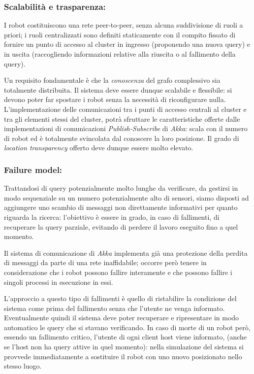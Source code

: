 \subsubsection*{Scalabilità e trasparenza:}
I robot costituiscono una rete peer-to-peer,
senza alcuna suddivisione di ruoli a priori; i ruoli centralizzati
sono definiti staticamente con il compito fissato di fornire un punto
di accesso al cluster in ingresso (proponendo una nuova query) e
in uscita (raccogliendo informazioni relative alla riuscita
o al fallimento della query).

Un requisito fondamentale è che
la \emph{conoscenza} del grafo complessivo sia totalmente distribuita.
Il sistema deve essere dunque scalabile e flessibile:
si devono poter far spostare i robot senza la necessità di
riconfigurare nulla. L'implementazione delle
comunicazioni tra i punti di accesso centrali al cluster e
tra gli elementi stessi del cluster, potrà
sfruttare le caratteristiche offerte dalle implementazioni di
comunicazioni \emph{Publish-Subscribe} di \emph{Akka}:
scala con il numero di robot ed è totalmente svincolata dal conoscere
la loro posizione.
Il grado di \emph{location transparency} offerto
deve dunque essere molto elevato.

\subsubsection*{Failure model:}
Trattandosi di query potenzialmente molto lunghe da verificare,
da gestirsi in modo sequenziale su un numero potenzialmente alto di sensori,
siamo disposti ad aggiungere uno scambio di messaggi non direttamente
informativi per quanto riguarda la ricerca: l'obiettivo è essere in grado,
in caso di fallimenti, di recuperare la query parziale,
evitando di perdere il lavoro eseguito fino a quel momento.

Il sistema di comunicazione di \emph{Akka} implementa già una
protezione della perdita di messaggi da parte di una rete inaffidabile;
occorre però tenere in considerazione che i robot possono fallire
interamente e che possono fallire i singoli processi in esecuzione in essi.

L'approccio a questo tipo di fallimenti è quello di ristabilire la
condizione del sistema come prima del fallimento senza che
l'utente ne venga informato. Eventualmente quindi il sistema deve poter
recuperare e ripresentare in modo automatico le query che si stavano
verificando. In caso di morte di un robot però,
essendo un fallimento critico, l'utente di ogni client host viene informato,
(anche se l'host non ha query attive in quel momento):
nella simulazione del sistema si provvede immediatamente a
sostituire il robot con uno nuovo posizionato nello stesso luogo.


